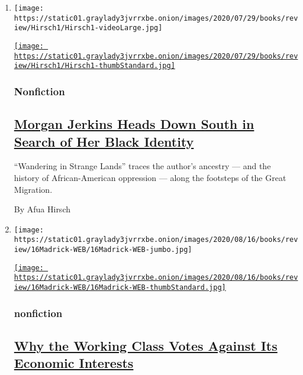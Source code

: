 \begin{enumerate}
\def\labelenumi{\arabic{enumi}.}
\item
  \texttt{[image: https://static01.graylady3jvrrxbe.onion/images/2020/07/29/books/review/Hirsch1/Hirsch1-videoLarge.jpg]}

  \href{/2020/08/03/books/review/wandering-in-strange-lands-morgan-jerkins.html}{\texttt{[image: https://static01.graylady3jvrrxbe.onion/images/2020/07/29/books/review/Hirsch1/Hirsch1-thumbStandard.jpg]}}

  \hypertarget{nonfiction}{%
  \subsubsection{Nonfiction}\label{nonfiction}}

  \hypertarget{morgan-jerkins-heads-down-south-in-search-of-her-black-identity}{%
  \subsection{\texorpdfstring{\href{/2020/08/03/books/review/wandering-in-strange-lands-morgan-jerkins.html}{Morgan
  Jerkins Heads Down South in Search of Her Black
  Identity}}{Morgan Jerkins Heads Down South in Search of Her Black Identity}}\label{morgan-jerkins-heads-down-south-in-search-of-her-black-identity}}

  ``Wandering in Strange Lands'' traces the author's ancestry --- and
  the history of African-American oppression --- along the footsteps of
  the Great Migration.

  By Afua Hirsch
\item
  \texttt{[image: https://static01.graylady3jvrrxbe.onion/images/2020/08/16/books/review/16Madrick-WEB/16Madrick-WEB-jumbo.jpg]}

  \href{/2020/07/31/books/review/the-system-robert-reich-break-em-up-zephyr-teachout.html}{\texttt{[image: https://static01.graylady3jvrrxbe.onion/images/2020/08/16/books/review/16Madrick-WEB/16Madrick-WEB-thumbStandard.jpg]}}

  \hypertarget{nonfiction-1}{%
  \subsubsection{nonfiction}\label{nonfiction-1}}

  \hypertarget{why-the-working-class-votes-against-its-economic-interests}{%
  \subsection{\texorpdfstring{\href{/2020/07/31/books/review/the-system-robert-reich-break-em-up-zephyr-teachout.html}{Why
  the Working Class Votes Against Its Economic
  Interests}}{Why the Working Class Votes Against Its Economic Interests}}\label{why-the-working-class-votes-against-its-economic-interests}}


\end{enumerate}
